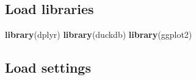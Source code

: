 \documentclass[
]{book}
\newenvironment{Shaded}{\begin{snugshade}}{\end{snugshade}}
\newcommand{\FunctionTok}[1]{\textcolor[rgb]{0.13,0.29,0.53}{\textbf{#1}}}
\newcommand{\NormalTok}[1]{#1}
\begin{document}
\subsection{Load libraries}\label{load-libraries}

\begin{Shaded}
\begin{Highlighting}[]
\FunctionTok{library}\NormalTok{(dplyr)}
\FunctionTok{library}\NormalTok{(duckdb)}
\FunctionTok{library}\NormalTok{(ggplot2)}
\end{Highlighting}
\end{Shaded}

\subsection{Load settings}\label{load-settings-3}
\end{document}

